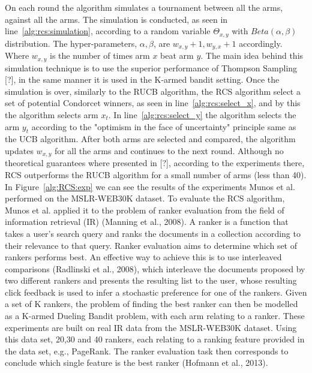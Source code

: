 \documentclass{llncs}
\begin{document}
	On each round the algorithm simulates a tournament between all the arms, against all the arms. 
	The simulation is conducted, as seen in line~\ref{alg:rcs:simulation}, according to a random variable $\Theta_{x,y} $	with $Beta(\alpha,\beta)$ distribution. 
	The hyper-parameters, $\alpha,\beta$, are $w_{x,y}+1,w_{y,x}+1$ accordingly. Where $w_{x,y}$ is the number of times arm $x$ beat arm $y$.
	The main idea behind this simulation technique is to use the superior performance of Thompson Sampling [?], in the same manner it is used in the K-armed bandit setting. 
	Once the simulation is over, similarly to the RUCB algorithm, the RCS algorithm select a set of potential Condorcet winners, as seen in line~\ref{alg:rcs:select_x}, and by this the algorithm selects arm $x_t$.
	In line~\ref{alg:rcs:select_y} the algorithm selects the arm $y_t$ according to the "optimism in the face of uncertainty" principle same as the UCB algorithm.
	After both arms are selected and compared, the algorithm updates $w_{x,y}$ for all the arms and continues to the next round. 
	Although no theoretical guarantees where presented in [?], according to the experiments there, RCS outperforms the RUCB algorithm for a small number of arms (less than 40).	
	In Figure~\ref{alg:RCS:exp} we can see the results of the experiments Munos et al. performed on the MSLR-WEB30K dataset.
	To evaluate the RCS algorithm, Munos et al. applied it to the problem of ranker evaluation from the field of information retrieval (IR) (Manning et al., 2008). 
	A ranker is a function that takes a user's search query and ranks the documents in a collection according to their relevance to that query. 
	Ranker evaluation aims to determine which set of rankers performs best.
	An effective way to achieve this is to use interleaved comparisons (Radlinski et al., 2008), which interleave the documents proposed by two different rankers and presents the resulting list to the user, whose resulting click feedback is used to infer a stochastic preference for one of the rankers. 
	Given a set of K rankers, the problem of finding the best ranker can then be modelled  as a K-armed Dueling Bandit problem, with each arm relating to a ranker.
	These experiments are built on real IR data from the MSLR-WEB30K dataset.
	Using this data set, 20,30 and 40 rankers, each relating to a ranking feature provided in the data set, e.g., PageRank. 
	The ranker evaluation task then corresponds to conclude which single feature is the best ranker (Hofmann et al., 2013).
	
\end{document}
